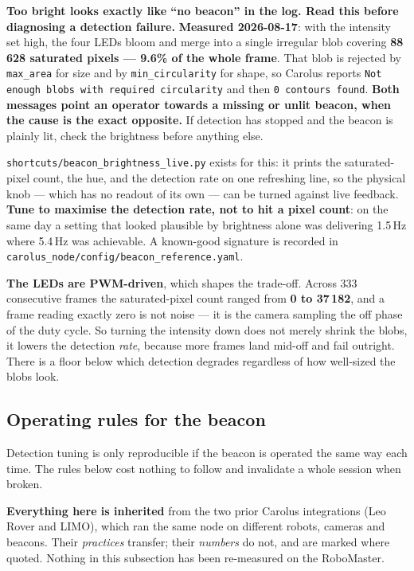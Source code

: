 \documentclass[11pt]{report}
\newenvironment{warningbox}%
  {\begin{lrbox}{\warnbox}\begin{minipage}{0.90\textwidth}}%
  {\end{minipage}\end{lrbox}%
   \begin{center}\fcolorbox{black}{codebg}{\usebox{\warnbox}}\end{center}}
\begin{document}
\begin{warningbox}
\textbf{Too bright looks exactly like ``no beacon'' in the log. Read this
before diagnosing a detection failure.} \textbf{Measured 2026-08-17}: with the
intensity set high, the four LEDs bloom and merge into a single irregular
blob covering \textbf{88\,628 saturated pixels --- 9.6\% of the whole frame}.
That blob is rejected by \texttt{max\_area} for size and by
\texttt{min\_circularity} for shape, so Carolus reports
\texttt{Not enough blobs with required circularity} and then
\texttt{0 contours found}. \textbf{Both messages point an operator towards a
missing or unlit beacon, when the cause is the exact opposite.} If detection
has stopped and the beacon is plainly lit, check the brightness before
anything else.

\texttt{shortcuts/beacon\_brightness\_live.py} exists for this: it prints the
saturated-pixel count, the hue, and the detection rate on one refreshing
line, so the physical knob --- which has no readout of its own --- can be
turned against live feedback. \textbf{Tune to maximise the detection rate,
not to hit a pixel count}: on the same day a setting that looked plausible by
brightness alone was delivering 1.5\,Hz where 5.4\,Hz was achievable.
A known-good signature is recorded in
\texttt{carolus\_node/config/beacon\_reference.yaml}.

\textbf{The LEDs are PWM-driven}, which shapes the trade-off. Across 333
consecutive frames the saturated-pixel count ranged from \textbf{0 to
37\,182}, and a frame reading exactly zero is not noise --- it is the camera
sampling the off phase of the duty cycle. So turning the intensity down does
not merely shrink the blobs, it lowers the detection \emph{rate}, because
more frames land mid-off and fail outright. There is a floor below which
detection degrades regardless of how well-sized the blobs look.
\end{warningbox}

\subsection{Operating rules for the beacon}
\label{sec:beacon-operating-rules}

Detection tuning is only reproducible if the beacon is operated the same way
each time. The rules below cost nothing to follow and invalidate a whole
session when broken.

\textbf{Everything here is \textbf{inherited}} from the two prior Carolus
integrations (Leo Rover and LIMO), which ran the same node on different
robots, cameras and beacons. Their \emph{practices} transfer; their
\emph{numbers} do not, and are marked where quoted. Nothing in this
subsection has been re-measured on the RoboMaster.
\end{document}
